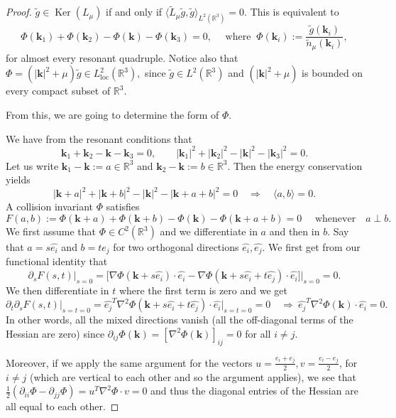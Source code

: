 \documentclass[reqno,11pt,letterpaper]{amsart}
\numberwithin{equation}{section}
\begin{document}
\begin{proof} $\widetilde g \in \operatorname{Ker}(L_\mu)$ if and only if $\langle \widetilde L_\mu \widetilde g,\widetilde g\rangle_{L^2(\mathbb{R}^3)}=0$. This is equivalent to
$$ \Phi(\textbf{k}_1) + \Phi(\textbf{k}_2) - \Phi(\textbf{k}) - \Phi(\textbf{k}_3) =0, \quad \text{ where }\ \Phi(\textbf{k}_i) := \frac{\widetilde g(\textbf{k}_i)}{\widetilde n_\mu(\textbf{k}_i)}, $$ 
for almost every resonant quadruple. Notice also that
$ \Phi=(|\textbf{k}|^2+\mu) \widetilde g \in L^2_{\text{loc}}(\mathbb{R}^3),$ 
since $\widetilde g\in L^2(\mathbb{R}^3)$ and $(|\textbf{k}|^2+\mu)$ is bounded on every compact subset of $\mathbb{R}^3$.

From this, we are going to determine the form of $\Phi$.

We have from the resonant conditions that $$\textbf{k}_1+ \textbf{k}_2 -\textbf{k}-\textbf{k}_3=0, \qquad |\textbf{k}_1|^2+ |\textbf{k}_2|^2 -|\textbf{k}|^2-|\textbf{k}_3|^2=0.$$
Let us write $\textbf{k}_1-\textbf{k}:=a \in \mathbb{R}^3$ and $\textbf{k}_2-\textbf{k}:=b \in \mathbb{R}^3$. Then the energy conservation yields
$$ |\textbf{k}+a|^2+ |\textbf{k}+b|^2 -|\textbf{k}|^2-|\textbf{k}+a+b|^2=0 \quad \Longrightarrow \quad \langle a,b\rangle =0.$$
A collision invariant $\Phi$ satisfies 
$$ F(a,b) := \Phi(\textbf{k}+a)+ \Phi(\textbf{k}+b) - \Phi(\textbf{k}) - \Phi(\textbf{k}+a+b)=0 \quad \text{ whenever} \quad a\perp b.$$  
We first assume that $\Phi\in C^2(\mathbb{R}^3)$ and we differentiate in $a$ and then in $b$. Say that $a=s \hat{e_i}$ and $b=t \hat{e_j}$ for two orthogonal directions $\hat{e_i}, \hat{e_j}$. We first get from our functional identity that
$$\partial_s F(s,t)\vert_{s=0} = \Big[  \nabla \Phi(\textbf{k}+s \hat{e_i}) \cdot \hat{e_i} - \nabla \Phi (\textbf{k}+s \hat{e_i} +t \hat{e_j} ) \cdot \hat{e_i} \Big]\vert_{s=0} =0. 
$$
We then differentiate in $t$ where the first term is zero and we get 
$$
\partial_{t} \partial_{s} F(s,t)\vert_{s=t=0} = \hat{e_j}^T \nabla^2 \Phi (\textbf{k} +s \hat{e_i} +t \hat{e_j} ) \cdot \hat{e_i} \vert_{s=t=0} =0 \quad \Longrightarrow  \ \hat{e_j}^T \nabla^2 \Phi (\textbf{k}) \cdot \hat{e_i} =0.
$$
In other words, all the mixed directions vanish (all the off-diagonal terms of the Hessian are zero)  since $\partial_{ij} \Phi( \textbf{k} ) = [\nabla^2 \Phi ( \textbf{k} )]_{ij}=0$ for all $i\neq j$.

Moreover, if we apply the same argument for the vectors $u=\frac{e_i+e_j}{2},v=\frac{e_i-e_j}{2}$, for $i\neq j$ (which are vertical to each other and so the argument applies), we see that $\frac{1}{2}(\partial_{ii}\Phi - \partial_{jj}\Phi) = u^T \nabla^2\Phi \cdot v =0$ and thus the diagonal entries of the Hessian are all equal to each other. 


\end{proof}
\end{document}
